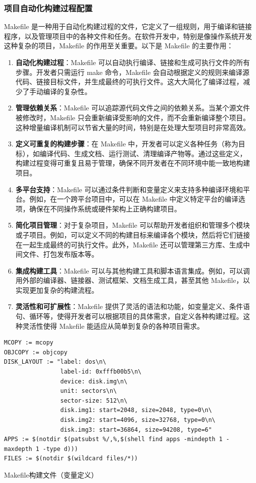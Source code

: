 \subsubsection{项目自动化构建过程配置}

Makefile 是一种用于自动化构建过程的文件，它定义了一组规则，用于编译和链接程序，以及管理项目中的各种文件和任务。在软件开发中，特别是像操作系统开发这种复杂的项目，Makefile 的作用至关重要。以下是 Makefile 的主要作用：

\begin{enumerate}
    \item \textbf{自动化构建过程}：Makefile 可以自动执行编译、链接和生成可执行文件的所有步骤。开发者只需运行 make 命令，Makefile 会自动根据定义的规则来编译源代码、链接目标文件，并生成最终的可执行文件。这大大简化了编译过程，减少了手动编译的复杂性。
    \item \textbf{管理依赖关系}：Makefile 可以追踪源代码文件之间的依赖关系。当某个源文件被修改时，Makefile 只会重新编译受影响的文件，而不会重新编译整个项目。这种增量编译机制可以节省大量的时间，特别是在处理大型项目时非常高效。
    \item \textbf{定义可重复的构建步骤}：在 Makefile 中，开发者可以定义各种任务（称为目标），如编译代码、生成文档、运行测试、清理编译产物等。通过这些定义，构建过程变得可重复且易于管理，确保不同开发者在不同环境中能一致地构建项目。
    \item \textbf{多平台支持}：Makefile 可以通过条件判断和变量定义来支持多种编译环境和平台。例如，在一个跨平台项目中，可以在 Makefile 中定义特定平台的编译选项，确保在不同操作系统或硬件架构上正确构建项目。
    \item \textbf{简化项目管理}：对于复杂项目，Makefile 可以帮助开发者组织和管理多个模块或子项目。例如，可以定义不同的构建目标来编译各个模块，然后将它们链接在一起生成最终的可执行文件。此外，Makefile 还可以管理第三方库、生成中间文件、打包发布版本等。
    \item \textbf{集成构建工具}：Makefile 可以与其他构建工具和脚本语言集成。例如，可以调用外部的编译器、链接器、测试框架、文档生成工具，甚至其他 Makefile，以实现更加复杂的构建流程。
    \item \textbf{灵活性和可扩展性}：Makefile 提供了灵活的语法和功能，如变量定义、条件语句、循环等，使得开发者可以根据项目的具体需求，自定义各种构建过程。这种灵活性使得 Makefile 能适应从简单到复杂的各种项目需求。
\end{enumerate}

\begin{listing}[htbp]
    \begin{verbatim}
MCOPY := mcopy
OBJCOPY := objcopy
DISK_LAYOUT := "label: dos\n\
                label-id: 0xfffb00b5\n\
                device: disk.img\n\
                unit: sectors\n\
                sector-size: 512\n\
                disk.img1: start=2048, size=2048, type=0\n\
                disk.img2: start=4096, size=32768, type=0\n\
                disk.img3: start=36864, size=94208, type=6"
APPS := $(notdir $(patsubst %/,%,$(shell find apps -mindepth 1 -maxdepth 1 -type d)))
FILES := $(notdir $(wildcard files/*))
    \end{verbatim}
    \caption{Makefile构建文件（变量定义）}\label{lst:MakefileVariable}
\end{listing}

